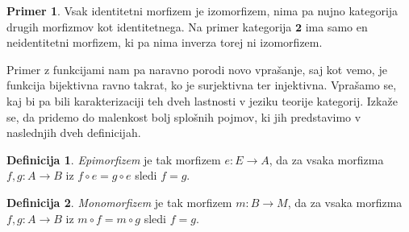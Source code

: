 \documentclass[12pt,a4paper]{book}
\theoremstyle{definition}
\newtheorem{definicija}{Definicija}[chapter]
\theoremstyle{plain}
\theoremstyle{definition}
\newtheorem*{primer*}{Primer}
\theoremstyle{remark}
\newcommand{\cat}[1]{\textbf{#1}}
\begin{document}
\begin{primer*}
Vsak identitetni morfizem je izomorfizem, nima pa nujno kategorija drugih morfizmov kot identitetnega. Na primer kategorija $\cat{2}$ ima samo en neidentitetni morfizem, ki pa nima inverza torej ni izomorfizem.
\end{primer*}

Primer z funkcijami nam pa naravno porodi novo vprašanje, saj kot vemo, je funkcija bijektivna ravno takrat, ko je surjektivna ter injektivna. Vprašamo se, kaj bi pa bili karakterizaciji teh dveh lastnosti v jeziku teorije kategorij. Izkaže se, da pridemo do malenkost bolj splošnih pojmov, ki jih predstavimo v naslednjih dveh definicijah.

\begin{definicija}
\emph{Epimorfizem} je tak morfizem $e : E \to A$, da za vsaka morfizma $f,g : A \to B$ iz $f \circ e = g \circ e$ sledi $f = g$.
\end{definicija}

\begin{definicija}
\emph{Monomorfizem} je tak morfizem $m : B \to M$, da za vsaka morfizma $f,g : A \to B$ iz $m \circ f = m \circ g$ sledi $f = g$.
\end{definicija}
\end{document}
